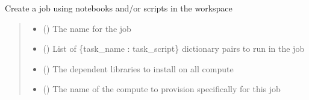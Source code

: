 \documentclass[letterpaper,10pt,english]{sphinxmanual}
\begin{document}
\begin{fulllineitems}
\begin{fulllineitems}
\label{\detokenize{aisquared.platform:aisquared.platform.DatabricksClient.DatabricksClient.create_job}}
\pysigstartsignatures
{}
\pysigstopsignatures
\sphinxAtStartPar
Create a job using notebooks and/or scripts in the workspace
\begin{quote}\begin{description}
\begin{itemize}
\item {} 
\sphinxAtStartPar
{} () \textendash{} The name for the job

\item {} 
\sphinxAtStartPar
{} () \textendash{} List of \{task\_name : task\_script\} dictionary pairs to run in the job

\item {} 
\sphinxAtStartPar
{} () \textendash{} The dependent libraries to install on all compute

\item {} 
\sphinxAtStartPar
{} () \textendash{} The name of the compute to provision specifically for this job


\end{itemize}
\end{description}
\end{quote}
\end{fulllineitems}
\end{fulllineitems}
\end{document}

